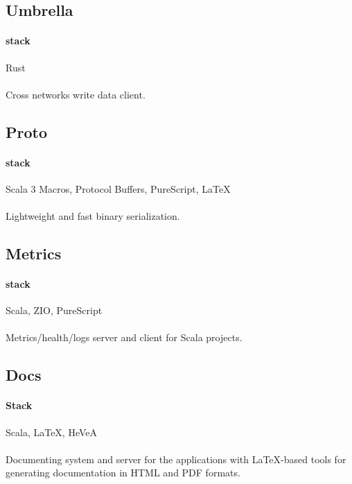 \subsection{Umbrella}
\paragraph{stack} Rust
\paragraph{}
Cross networks write data client.

\subsection{Proto}
\paragraph{stack}{Scala 3 Macros, Protocol Buffers, PureScript, LaTeX}
\paragraph{}
Lightweight and fast binary serialization.

\subsection{Metrics}
\paragraph{stack} Scala, ZIO, PureScript
\paragraph{}
Metrics/health/logs server and client for Scala projects.

\subsection{Docs}
\paragraph{Stack} Scala, LaTeX, HeVeA
\paragraph{}
Documenting system and server for the applications with LaTeX-based tools for generating documentation in HTML and PDF formats.

